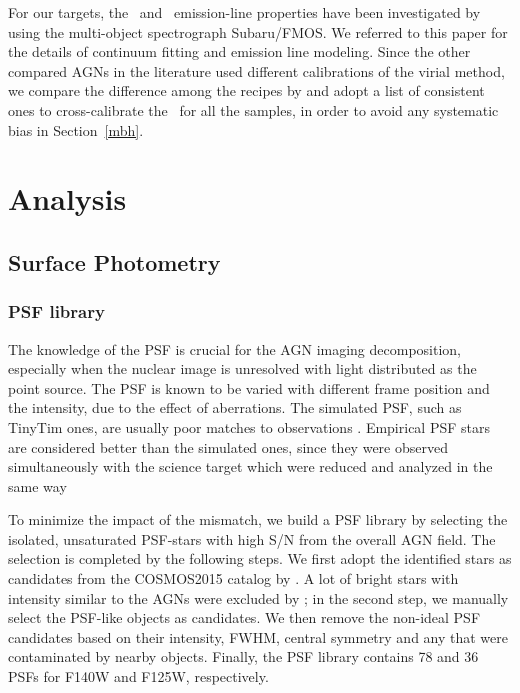 \documentclass[apj]{emulateapj}
\begin{document}
For our targets, the \halpha\ and \hbeta\ emission-line properties have been investigated by \citet{Schulze2018} using the multi-object spectrograph Subaru/FMOS. We referred to this paper for the details of continuum fitting and emission line modeling. Since the other compared AGNs in the literature used different calibrations of the virial method, we compare the difference among the recipes by \citet{Schulze2018, McG++08, Ding2017b} and adopt a list of consistent ones to cross-calibrate the \mbh\ for all the samples, in order to avoid any systematic bias in Section~\ref{mbh}.
 
\section{Analysis}
\label{sec:analysis}

\subsection{Surface Photometry}
\subsubsection{PSF library}    
\label{sec:psf_library}
The knowledge of the PSF is crucial for the AGN imaging decomposition, especially when the nuclear image is unresolved with light distributed as the point source. The PSF is known to be varied with different frame position and the intensity, due to the effect of aberrations. The simulated PSF, such as {\sc TinyTim} ones, are usually poor matches to observations \citet{Mechtley2012}. Empirical PSF stars are considered better than the simulated ones, since they were observed simultaneously with the science target which were reduced and analyzed in the same way \citet{Kim2008, Park15}

To minimize the impact of the mismatch, we build a PSF library by selecting the isolated, unsaturated PSF-stars with high S/N from the overall AGN field. The selection is completed by the following steps. We first adopt the identified stars as candidates from the COSMOS2015 catalog by \citet{Laigle2016}. A lot of bright stars with intensity similar to the AGNs were excluded by \citet{Laigle2016}; in the second step, we manually select the PSF-like objects as candidates. We then remove the non-ideal PSF candidates based on their intensity, FWHM, central symmetry and any that were contaminated by nearby objects. Finally, the PSF library contains 78 and 36 PSFs for F140W and F125W, respectively.
\end{document}
